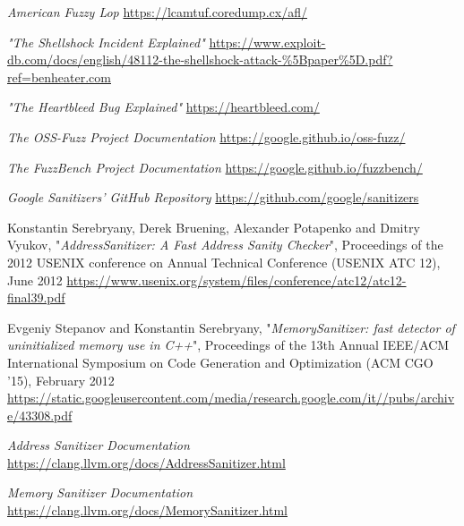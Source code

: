 \documentclass[Lau,oneside]{sapthesis}%
\begin{document}
\backmatter
{}
\begin{thebibliography}{0}

\textit{American Fuzzy Lop}
\newline
\url{https://lcamtuf.coredump.cx/afl/}

\textit{"The Shellshock Incident Explained"}
\newline
\url{https://www.exploit-db.com/docs/english/48112-the-shellshock-attack-%5Bpaper%5D.pdf?ref=benheater.com}

\textit{"The Heartbleed Bug Explained"}
\newline
\url{https://heartbleed.com/}

\textit{The OSS-Fuzz Project Documentation}
\newline
\url{https://google.github.io/oss-fuzz/}

\textit{The FuzzBench Project Documentation}
\newline
\url{https://google.github.io/fuzzbench/}

\textit{Google Sanitizers' GitHub Repository}
\newline
\url{https://github.com/google/sanitizers}

Konstantin Serebryany, Derek Bruening, Alexander Potapenko and Dmitry Vyukov, "\textit{AddressSanitizer: A Fast Address Sanity Checker}", Proceedings of the 2012 USENIX conference on Annual Technical Conference (USENIX ATC 12), June 2012
\newline
\url{https://www.usenix.org/system/files/conference/atc12/atc12-final39.pdf}

Evgeniy Stepanov and Konstantin Serebryany, "\textit{MemorySanitizer: fast detector of uninitialized memory use in C++}", Proceedings of the 13th Annual IEEE/ACM International Symposium on Code Generation and Optimization (ACM CGO '15), February 2012
\newline
\url{https://static.googleusercontent.com/media/research.google.com/it//pubs/archive/43308.pdf}

\textit{Address Sanitizer Documentation}
\newline
\url{https://clang.llvm.org/docs/AddressSanitizer.html}

\textit{Memory Sanitizer Documentation}
\newline
\url{https://clang.llvm.org/docs/MemorySanitizer.html}


\end{thebibliography}
\end{document}
